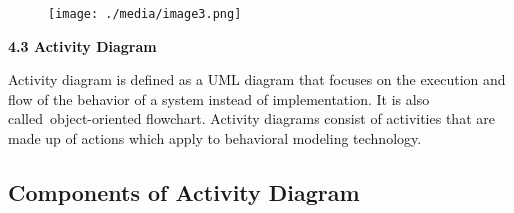 \documentclass[12pt]{report}
\renewcommand{\_}{\kern-1.5pt\textunderscore\kern-1.5pt}
\begin{document}
\begin{figure}[H]
	\begin{Center}
		\texttt{[image: ./media/image3.png]}
	\end{Center}
\end{figure}



\par


\vspace{\baselineskip}

\vspace{\baselineskip}

\vspace{\baselineskip}

\vspace{\baselineskip}

\vspace{\baselineskip}

\vspace{\baselineskip}

\vspace{\baselineskip}
\begin{adjustwidth}{0.2in}{0.84in}
\begin{justify}
{\fontsize{14pt}{16.8pt}\selectfont \textbf{\textcolor[HTML]{0D0D0D}{4.3 Activity Diagram}}\par}
\end{justify}\par

\end{adjustwidth}


\vspace{\baselineskip}
\begin{adjustwidth}{0.2in}{0.84in}
\begin{justify}
\textcolor[HTML]{0D0D0D}{Activity diagram is defined as a UML diagram that focuses on the execution and flow of the behavior of a system instead of implementation. It is also called object-oriented flowchart. Activity diagrams consist of activities that are made up of actions which apply to behavioral modeling technology.}
\end{justify}\par

\end{adjustwidth}


\vspace{\baselineskip}
\begin{adjustwidth}{0.2in}{0.84in}
\subsection*{Components of Activity Diagram}
\end{adjustwidth}
\end{document}
